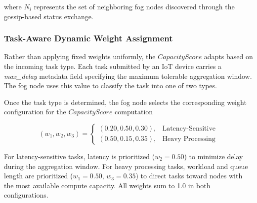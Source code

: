 \documentclass[conference]{IEEEtran}
\begin{document}
    where $N_i$ represents the set of neighboring fog nodes discovered through the gossip-based status exchange.

    \subsubsection{Task-Aware Dynamic Weight Assignment}

    Rather than applying fixed weights uniformly, the $CapacityScore$ adapts based on the incoming task type. Each task submitted by an IoT device carries a \textit{max\_delay} metadata field specifying the maximum tolerable aggregation window. The fog node uses this value to classify the task into one of two types.

    \begin{table}[htbp]
    \caption{Task Classification Based on Delay Requirement}
    \label{table:task-classification}
    \centering
    \end{table}

    Once the task type is determined, the fog node selects the corresponding weight configuration for the $CapacityScore$ computation

    \begin{equation}
    (w_1, w_2, w_3) =
    \begin{cases}
    (0.20, 0.50, 0.30), & \text{Latency-Sensitive} \\
    (0.50, 0.15, 0.35), & \text{Heavy Processing}
    \end{cases}
    \end{equation}

    For latency-sensitive tasks, latency is prioritized ($w_2 = 0.50$) to minimize delay during the aggregation window. For heavy processing tasks, workload and queue length are prioritized ($w_1 = 0.50$, $w_3 = 0.35$) to direct tasks toward nodes with the most available compute capacity. All weights sum to 1.0 in both configurations.
\end{document}

